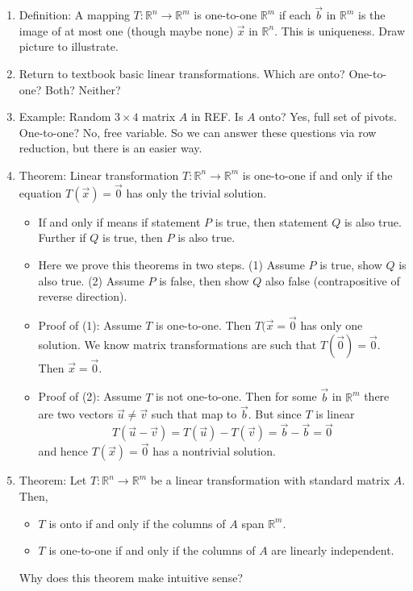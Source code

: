 \documentclass{article}
\begin{document}
\begin{enumerate}
\begin{enumerate}
\item Definition: A mapping $T:\mathbb{R}^n \rightarrow \mathbb{R}^m$ is one-to-one $\mathbb{R}^m$ if each $\vec{b}$ in $\mathbb{R}^m$ is the image of at most one (though maybe none) $\vec{x}$ in $\mathbb{R}^n$. This is uniqueness. Draw picture to illustrate.

\item Return to textbook basic linear transformations. Which are onto? One-to-one? Both? Neither?

\item Example: Random $3 \times 4$ matrix $A$ in REF. Is $A$ onto? Yes, full set of pivots. One-to-one? No, free variable. So we can answer these questions via row reduction, but there is an easier way.

\item Theorem: Linear transformation $T:\mathbb{R}^n \rightarrow \mathbb{R}^m$ is one-to-one if and only if the equation $T(\vec{x})=\vec{0}$ has only the trivial solution.
\begin{itemize}

\item If and only if means if statement $P$ is true, then statement $Q$ is also true. Further if $Q$ is true, then $P$ is also true.

\item Here we prove this theorems in two steps. (1) Assume $P$ is true, show $Q$ is also true. (2) Assume $P$ is false, then show $Q$ also false (contrapositive of reverse direction).

\item Proof of (1): Assume $T$ is one-to-one. Then $T(\vec{x}=\vec{0}$ has only one solution. We know matrix transformations are such that $T(\vec{0})=\vec{0}$. Then $\vec{x}=\vec{0}$.

\item Proof of (2): Assume $T$ is not one-to-one. Then for some $\vec{b}$ in $\mathbb{R}^m$ there are two vectors $\vec{u} \neq \vec{v}$ such that map to $\vec{b}$. But since $T$ is linear
\[
T(\vec{u}-\vec{v}) = T(\vec{u})-T(\vec{v}) = \vec{b}-\vec{b}=\vec{0}
\]
and hence $T(\vec{x})=\vec{0}$ has a nontrivial solution.
\end{itemize}

\item Theorem: Let $T:\mathbb{R}^n \rightarrow \mathbb{R}^m$ be a linear transformation with standard matrix $A$. Then,
\begin{itemize}
\item $T$ is onto if and only if the columns of $A$ span $\mathbb{R}^m$.
\item $T$ is one-to-one if and only if the columns of $A$ are linearly independent.
\end{itemize}
Why does this theorem make intuitive sense?



\end{enumerate}
\end{enumerate}
\end{document}
